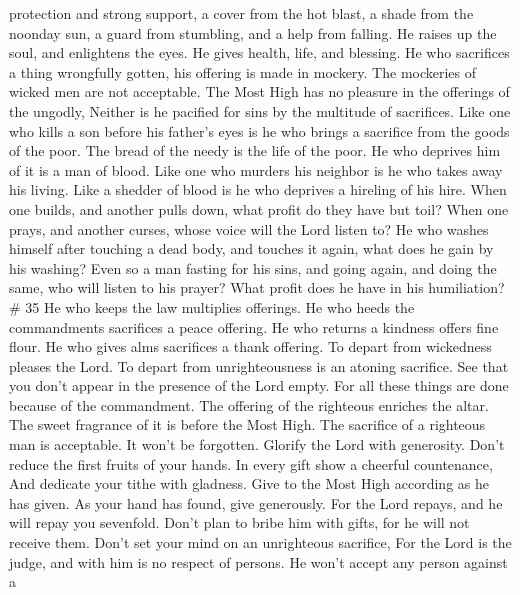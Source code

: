 protection and strong support, a cover from the hot blast, a shade from
the noonday sun, a guard from stumbling, and a help from falling.
 He raises up the soul, and enlightens the eyes. He gives
health, life, and blessing.  He who sacrifices a thing
wrongfully gotten, his offering is made in mockery. The mockeries of
wicked men are not acceptable.  The Most High has no
pleasure in the offerings of the ungodly, Neither is he pacified for
sins by the multitude of sacrifices.  Like one who kills a
son before his father's eyes is he who brings a sacrifice from the goods
of the poor.  The bread of the needy is the life of the
poor. He who deprives him of it is a man of blood.  Like
one who murders his neighbor is he who takes away his living. Like a
shedder of blood is he who deprives a hireling of his hire.
 When one builds, and another pulls down, what profit do
they have but toil?  When one prays, and another curses,
whose voice will the Lord listen to?  He who washes himself
after touching a dead body, and touches it again, what does he gain by
his washing?  Even so a man fasting for his sins, and going
again, and doing the same, who will listen to his prayer? What profit
does he have in his humiliation? \# 35  He who keeps the law
multiplies offerings. He who heeds the commandments sacrifices a peace
offering.  He who returns a kindness offers fine flour. He
who gives alms sacrifices a thank offering.  To depart from
wickedness pleases the Lord. To depart from unrighteousness is an
atoning sacrifice.  See that you don't appear in the
presence of the Lord empty.  For all these things are done
because of the commandment.  The offering of the righteous
enriches the altar. The sweet fragrance of it is before the Most High.
 The sacrifice of a righteous man is acceptable. It won't be
forgotten.  Glorify the Lord with generosity. Don't reduce
the first fruits of your hands.  In every gift show a
cheerful countenance, And dedicate your tithe with gladness.
 Give to the Most High according as he has given. As your
hand has found, give generously.  For the Lord repays, and
he will repay you sevenfold.  Don't plan to bribe him with
gifts, for he will not receive them. Don't set your mind on an
unrighteous sacrifice, For the Lord is the judge, and with him is no
respect of persons.  He won't accept any person against a
